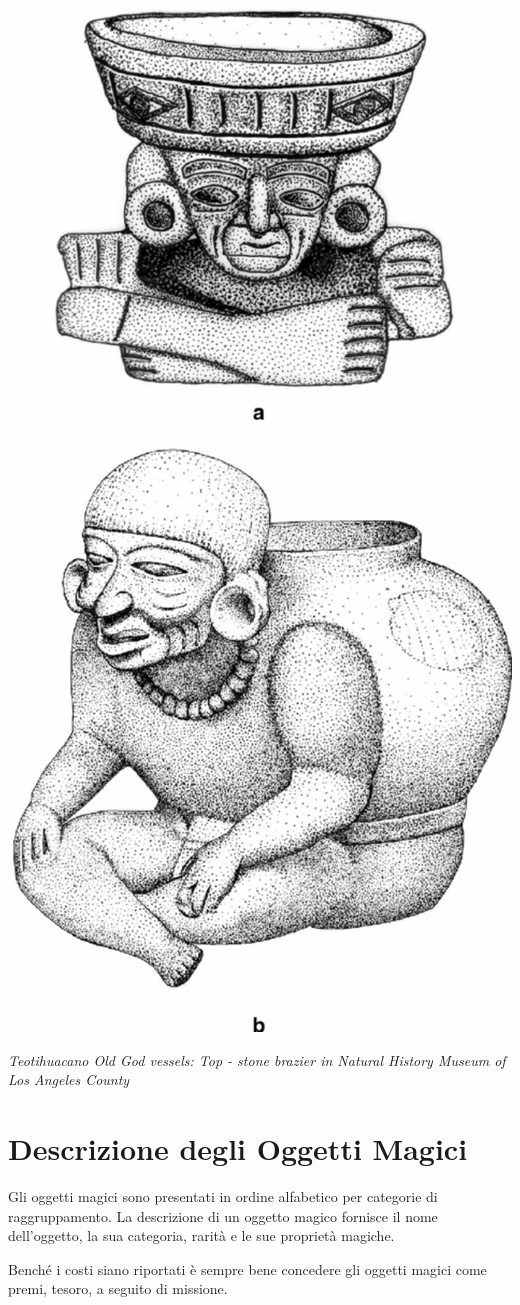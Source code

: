 \begin{multicols}{2}
	\begin{center}
		\includegraphics[width=0.6\linewidth]{immagini/ancientbraziers2.png}

		\textit{Teotihuacano Old God vessels: Top - stone brazier in Natural History Museum of Los Angeles County}
	\end{center}




	\pagebreak

	\section{Descrizione degli Oggetti Magici}


	Gli oggetti magici sono presentati in ordine alfabetico per categorie di raggruppamento. La descrizione di un oggetto magico fornisce il nome dell'oggetto, la sua categoria, rarità e le sue proprietà magiche.

	Benché i costi siano riportati è sempre bene concedere gli oggetti magici come premi, tesoro, a seguito di missione.


\end{multicols}

